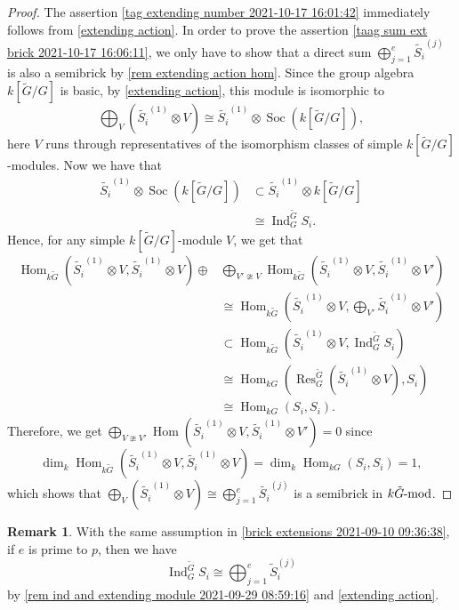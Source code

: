 \documentclass[pdftex,a4paper]{article}
\numberwithin{equation}{subsection}
\theoremstyle{definition}
\newtheorem{remark}[theorem]{Remark}
\newcommand{\lmod}{\operatorname{\mathrm{\hspace{-2pt}-mod}}}
\newcommand{\Soc}{{\operatorname{Soc}\nolimits}}
\newcommand{\Hom}{\operatorname{Hom}\nolimits}
\newcommand{\induc}{{\operatorname{Ind}\nolimits}}
\newcommand{\restr}{{\operatorname{Res}\nolimits}}
\begin{document}
\begin{proof}
	The assertion \ref{tag extending number 2021-10-17 16:01:42} immediately follows from \cref{extending action}.
	In order to prove the assertion \ref{taag sum ext brick 2021-10-17 16:06:11}, we only have to show that a direct sum \(\bigoplus_{j=1}^{e}\tilde{S_i}^{(j)}\) is also a semibrick by \cref{rem extending action hom}.
	Since the group algebra \(k[\tilde{G}/G]\) is basic, by \cref{extending action}, this module is isomorphic to
	\begin{equation}
		\bigoplus_{V} \left( \tilde{S_i}^{(1)} \otimes V \right) \cong \tilde{S_i}^{(1)} \otimes \Soc (k[\tilde{G}/G]),
	\end{equation}
	here \(V\) runs through representatives of the isomorphism classes of simple \(k[\tilde{G}/G]\)-modules.
	Now we have that
	\begin{align}
		\tilde{S_i}^{(1)} \otimes \Soc (k[\tilde{G}/G])
		 & \subset  \tilde{S_i}^{(1)} \otimes k[\tilde{G}/G] \\
		 & \cong    \induc_G^{\tilde{G}} S_i.
	\end{align}
	Hence, for any simple \(k[\tilde{G}/G]\)-module \(V\), we get that
	\begin{align}
		\Hom_{k\tilde{G}} (\tilde{S_i}^{(1)}\otimes  V,\tilde{S_i}^{(1)}\otimes V)\oplus
		 & \bigoplus_{V'\ncong V}\Hom_{k\tilde{G}} (\tilde{S_i}^{(1)}\otimes V,\tilde{S_i}^{(1)}\otimes V') \\
		 & \cong \Hom_{k\tilde{G}} (\tilde{S_i}^{(1)}\otimes V,\bigoplus_{V'}\tilde{S_i}^{(1)}\otimes V')   \\
		 & \subset \Hom_{k\tilde{G}} (\tilde{S_i}^{(1)}\otimes V,\induc_G^{\tilde{G}} S_i)                  \\
		 & \cong \Hom_{kG} (\restr_G^{\tilde{G}} (\tilde{S_i}^{(1)}\otimes V),S_i)                          \\
		 & \cong \Hom_{kG} (S_i,S_i).
	\end{align}
	Therefore, we get \(\bigoplus_{V\ncong V'}\Hom (\tilde{S_i}^{(1)}\otimes V,\tilde{S_i}^{(1)}\otimes V')=0\) since
	\begin{equation}
		\dim_k\Hom_{k\tilde{G}} (\tilde{S_i}^{(1)}\otimes V,\tilde{S_i}^{(1)}\otimes V)=\dim_k\Hom_{kG} (S_i,S_i)=1,
	\end{equation}
	which shows that \(\bigoplus_{V} ( \tilde{S_i}^{(1)} \otimes V)\cong \bigoplus_{j=1}^e \tilde{S_i}^{(j)}\) is a semibrick in \(k\tilde{G}\lmod\).
\end{proof}
\begin{remark}
	With the same assumption in \cref{brick extensions 2021-09-10 09:36:38}, if \(e\) is prime to \(p\), then we have
	\begin{equation}
		\induc_G^{\tilde{G}} S_i\cong \bigoplus_{j=1}^e \tilde{S}_i^{(j)}
	\end{equation}
	by \cref{rem ind and extending module 2021-09-29 08:59:16} and \cref{extending action}.
\end{remark}
\end{document}

